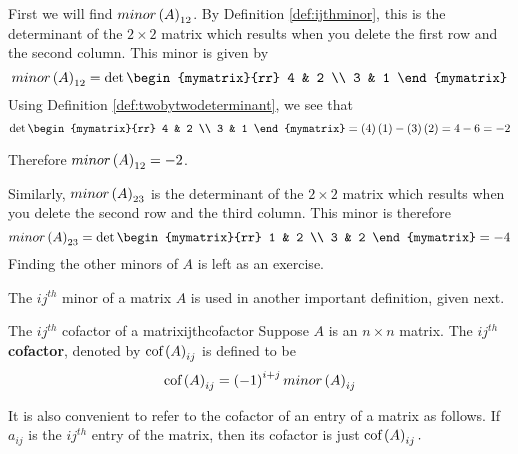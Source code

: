 \begin{solution} First we will find $minor\left(A\right) _{12}$. By Definition
\ref{def:ijthminor}, this is the determinant of the $2\times 2$ matrix
which results when you delete the first row and the second column. This
minor is given by
\begin{equation*}
minor \tup{A}_{12}
=
\det \begin{mymatrix}{rr}
4 & 2 \\
3 & 1
\end{mymatrix}
\end{equation*}
Using Definition \ref{def:twobytwodeterminant}, we see that 
\begin{equation*}
\det \begin{mymatrix}{rr}
4 & 2 \\
3 & 1
\end{mymatrix} = \tup{4}\tup{1} - \tup{3}\tup{2} = 4 - 6 = -2
\end{equation*}

Therefore $minor \left(A\right)_{12} = -2$. 

Similarly, $minor\left(A\right)_{23}$ is the determinant of the $2\times 2$ matrix
which results when you delete the second row and the third column. This
minor is therefore
\begin{equation*}
minor \tup{A}_{23} 
=
\det \begin{mymatrix}{rr}
1 & 2 \\
3 & 2
\end{mymatrix} = -4
\end{equation*}
Finding the other minors of $A$ is left as an exercise. 
\end{solution}

The $ij^{th}$ minor of a matrix $A$ is used in another important definition, given next.

\begin{definition}{The $ij^{th}$ cofactor of a matrix}{ijthcofactor}
Suppose $A$ is an $n\times n$ matrix. The $ij^{th}$ \textbf{cofactor}, denoted by $\mbox{cof}\left(A\right) _{ij}$ is
defined to be 
\begin{equation*}
\mbox{cof}\left(A\right) _{ij} = \left(-1\right) ^{i+j} minor\left(A\right)_{ij} 
\end{equation*}
\end{definition}

It is also convenient to refer to the
cofactor of an entry of a matrix as follows. If $a_{ij}$ is the $ij^{th}$ entry of the
matrix, then its cofactor is just $\mbox{cof}\left(A\right) _{ij}.$

